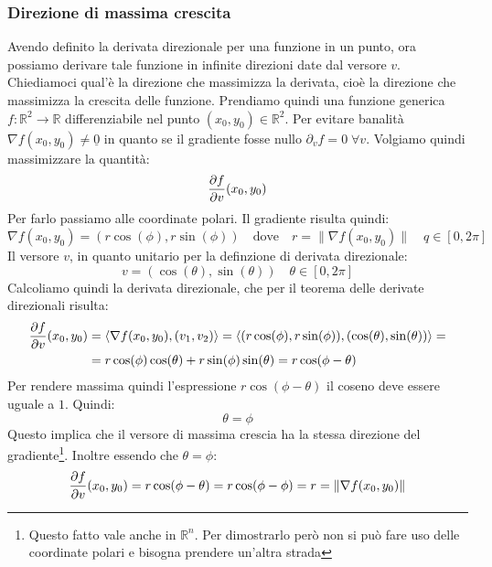 \subsubsection{Direzione di massima crescita}
Avendo definito la derivata direzionale per una funzione in un punto, ora possiamo derivare tale funzione in infinite direzioni date dal versore $v$. Chiediamoci qual'è la direzione che massimizza la derivata, cioè la direzione che massimizza la crescita delle funzione. Prendiamo quindi una funzione generica $f: \mathbb{R}^2 \to \mathbb{R}$ differenziabile nel punto $(x_0, y_0) \in \mathbb{R}^2$. Per evitare banalità $\nabla f(x_0, y_0) \neq \underline{0}$ in quanto se il gradiente fosse nullo $\partial_v f = 0 \; \forall v$. Volgiamo quindi massimizzare la quantità:
\begin{equation*}
	\pdv{f}{v}()(x_0, y_0)
\end{equation*}
Per farlo passiamo alle coordinate polari. Il gradiente risulta quindi:
\begin{equation*}
	\nabla f(x_0, y_0) = (r\cos(\phi), r\sin(\phi)) \quad \text{dove} \quad r = \lVert \nabla f(x_0, y_0) \rVert \quad q \in [0, 2\pi]
\end{equation*}
Il versore $v$, in quanto unitario per la definzione di derivata direzionale:
\begin{equation*}
	v = (\cos(\theta), \sin(\theta)) \quad \theta \in [0, 2\pi]
\end{equation*}
Calcoliamo quindi la derivata direzionale, che per il teorema delle derivate direzionali risulta:
\begin{align*}
	\pdv{f}{v}()(x_0, y_0) &= \langle \nabla f(x_0, y_0), (v_1, v_2) \rangle = \langle (r\cos(\phi), r\sin(\phi)), (\cos(\theta), \sin(\theta)) \rangle =\\
	&= r\cos(\phi)\cos(\theta) + r\sin(\phi)\sin(\theta) = r \cos(\phi - \theta)
\end{align*}
Per rendere massima quindi l'espressione $r \cos(\phi - \theta)$ il coseno deve essere uguale a $1$. Quindi:
\begin{equation*}
	\theta = \phi
\end{equation*}
Questo implica che il versore di massima crescia ha la stessa direzione del gradiente\footnote{Questo fatto vale anche in $\mathbb{R}^n$. Per dimostrarlo però non si può fare uso delle coordinate polari e bisogna prendere un'altra strada}. Inoltre essendo che $\theta = \phi$:
\begin{equation*}
	\pdv{f}{v}()(x_0, y_0) = r\cos(\phi - \theta) = r\cos(\phi - \phi) = r = \lVert \nabla f(x_0, y_0) \rVert
\end{equation*}
